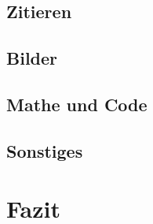 \documentclass[12pt]{scrartcl}
\begin{document}
    \subsection{Zitieren}
    
    \subsection{Bilder}
    
    \subsection{Mathe und Code} \label{sec:mathe}
    
    \subsection{Sonstiges} \label{sec:sonstiges}
    
\newpage
\section{Fazit}


\newpage


\pagebreak
\end{document}
